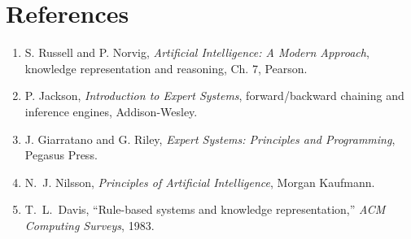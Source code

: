 \documentclass[10pt,twocolumn]{article}
\begin{document}
\section*{References}
\begin{enumerate}[leftmargin=*,nosep,label=[\arabic*]]
\item S. Russell and P. Norvig, \emph{Artificial Intelligence: A Modern
  Approach}, knowledge representation and reasoning, Ch. 7, Pearson.
\item P. Jackson, \emph{Introduction to Expert Systems}, forward/backward
  chaining and inference engines, Addison-Wesley.
\item J. Giarratano and G. Riley, \emph{Expert Systems: Principles and
  Programming}, Pegasus Press.
\item N.~J. Nilsson, \emph{Principles of Artificial Intelligence}, Morgan Kaufmann.
\item T.~L.~Davis, ``Rule-based systems and knowledge representation,''
  \emph{ACM Computing Surveys}, 1983.
\end{enumerate}
\end{document}
